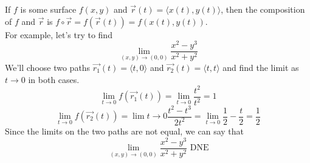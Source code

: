 \noindent
If $f$ is some surface $f(x, y)$ and $\vec{r}(t) = \langle x(t), y(t)\rangle$, then the composition of $f$ and $\vec{r}$ is $f\circ\vec{r} = f(\vec{r}(t)) = f(x(t), y(t))$.\\
For example, let's try to find
\begin{equation*}
	\lim_{(x,y) \to (0,0)}{\frac{x^2-y^3}{x^2+y^2}}
\end{equation*}
\indent
We'll choose two paths $\vec{r_1}(t) = \langle t, 0 \rangle$ and $\vec{r_2}(t) = \langle t, t \rangle$ and find the limit as $t \to 0$ in both cases.\\
\indent
\begin{equation*}
	\lim_{t \to 0}{f(\vec{r_1}(t))} = \lim_{t \to 0}{\frac{t^2}{t^2}} = 1
\end{equation*}
\indent
\begin{equation*}
	\lim_{t \to 0}{f(\vec{r_2}(t))} = \lim{t \to 0}{\frac{t^2-t^3}{2t^2}} = \lim_{t \to 0}{\frac{1}{2} - \frac{t}{2}} = \frac{1}{2}
\end{equation*}
\indent
Since the limits on the two paths are not equal, we can say that
\begin{equation*}
	\lim_{(x,y) \to (0,0)}{\frac{x^2-y^3}{x^2+y^2}} \text{ DNE}
\end{equation*}
